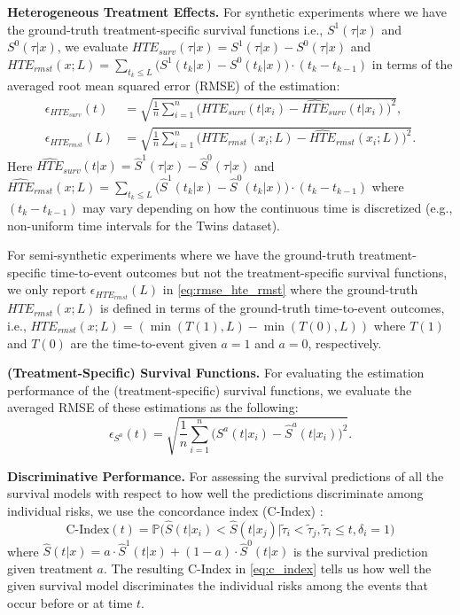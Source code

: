 \documentclass{article}
\newcommand{\PR}{{\mathbb P}}
\begin{document}
\textbf{Heterogeneous Treatment Effects.} 
For synthetic experiments where we have the ground-truth treatment-specific survival functions i.e., $S^{1}(\tau|x)$ and $S^{0}(\tau|x)$, we evaluate $HTE_{surv}(\tau|x) = S^{1}(\tau|x) - S^{0}(\tau|x)$ and $HTE_{rmst}(x; L) = 
\sum_{t_{k} \leq L} \big(S^{1}(t_{k}|x) - S^{0}(t_{k}|x) \big) \cdot (t_{k}- t_{k{-}1})$ in terms of the averaged root mean squared error (RMSE) of the estimation:
\begin{align}
\epsilon_{HTE_{surv}}(t) &= \sqrt{\frac{1}{n}\sum_{i=1}^{n} \big(HTE_{surv}(t|x_{i}) - \widehat{HTE}_{surv}(t|x_{i})\big)^{2}}, \\
\epsilon_{HTE_{rmst}}(L) &= \sqrt{\frac{1}{n}\sum_{i=1}^{n} \big(HTE_{rmst}(x_{i}; L) - \widehat{HTE}_{rmst}(x_{i}; L)\big)^{2}}. \label{eq:rmse_hte_rmst}
\end{align}
Here $\widehat{HTE}_{surv}(t|x) = \hat{S}^{1}(\tau|x) - \hat{S}^{0}(\tau|x)$ and $\widehat{HTE}_{rmst}(x; L) = \sum_{t_{k} \leq L} \big(\hat{S}^{1}(t_{k}|x) - \hat{S}^{0}(t_{k}|x) \big) \cdot (t_{k}- t_{k{-}1})$ where $(t_{k} - t_{k-1})$ may vary depending on how the continuous time is discretized (e.g., non-uniform time intervals for the Twins dataset).

For semi-synthetic experiments where we have the ground-truth treatment-specific time-to-event outcomes but not the treatment-specific survival functions, we only report $\epsilon_{HTE_{rmst}}(L)$ in \eqref{eq:rmse_hte_rmst} where the ground-truth $HTE_{rmst}(x; L)$ is defined in terms of the ground-truth time-to-event outcomes, i.e., $HTE_{rmst}(x; L) = (\min(T(1), L) - \min(T(0),L))$ where $T(1)$ and $T(0)$ are the time-to-event given $a=1$ and $a=0$, respectively.

\textbf{(Treatment-Specific) Survival Functions.}  For evaluating the estimation performance of the (treatment-specific) survival functions, we evaluate the averaged RMSE of these estimations as the following:
\begin{equation} \label{eq:c_index}
    \epsilon_{S^{a}}(t) =\sqrt{ \frac{1}{n}\sum_{i=1}^{n} \big(S^{a}(t|x_{i}) - \hat{S}^{a}(t|x_{i})\big)^{2}}.
\end{equation}

\textbf{Discriminative Performance.} 
For assessing the survival predictions of all the survival models with respect to how well the predictions discriminate among individual risks, we use the concordance index (C-Index) \cite{uno2011cindex}: 
\begin{equation}
    \text{C-Index}(t) = \PR\big(\hat{S}(t|x_{i}) < \hat{S}(t|x_{j}) \big| \tilde{\tau}_{i} < \tilde{\tau}_{j}, \tilde{\tau}_{i} \leq t, \delta_{i} = 1 \big)
\end{equation}
where $\hat{S}(t|x) = a\cdot\hat{S}^{1}(t|x) + (1-a)\cdot \hat{S}^{0}(t|x)$ is the survival prediction given treatment $a$. The resulting C-Index in \eqref{eq:c_index} tells us how well the given survival model discriminates the individual risks among the events that occur before or at time $t$.
\end{document}
